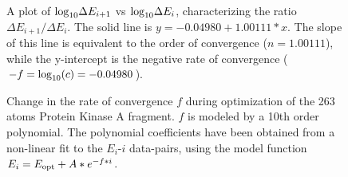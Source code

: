 \documentclass[prl,twocolumn,showpacs,twocolumngrid,superbib]{revtex4}
\begin{document}
{\begin{figure}[h]
\caption{A plot of ${\rm log}_{10} \Delta E_{i+1}$ vs  ${\rm log}_{10} \Delta E_{i}$,  characterizing the ratio 
         $\Delta E_{i+1}/\Delta E_i$.  The solid line is $y=-0.04980+1.00111 *x$. 
         The slope  of this line is equivalent to the order of convergence ($n=1.00111$), 
         while the y-intercept is the negative rate of convergence ($-f ={\rm log}_{10}(c)= -0.04980$).}
\label{loglogplot}
\end{figure}

\begin{figure}[h]
\caption{
Change in the rate of convergence $f$ during  optimization
of the 263 atoms Protein Kinase A fragment. $f$ is modeled
by a 10th order polynomial. The polynomial coefficients
have been obtained from a non-linear fit to the $E_{i}$-$i$
data-pairs, using the model function $E_{i}=E_{\rm opt}+A*e^{-f*i}$.}
\label{convfact} 
\end{figure}
}
\end{document}
